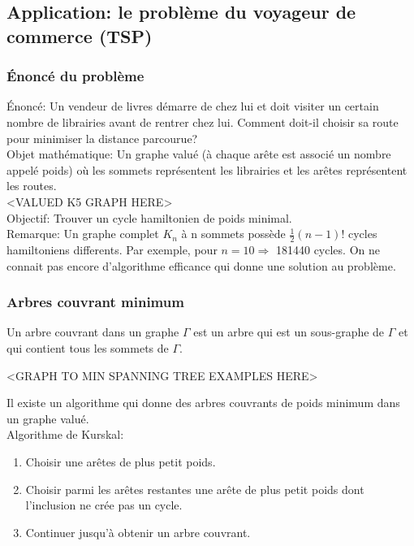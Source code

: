 \subsection{Application: le problème du voyageur de commerce (TSP)}

\subsubsection{Énoncé du problème}

Énoncé: Un vendeur de livres démarre de chez lui et doit visiter un certain nombre de librairies avant de rentrer chez lui. Comment doit-il choisir sa route pour minimiser la distance parcourue? \\ 

Objet mathématique: Un graphe valué (à chaque arête est associé un nombre appelé poids) où les sommets représentent les librairies et les arêtes représentent les routes.\\

<VALUED K5 GRAPH HERE>\\

Objectif: Trouver un cycle hamiltonien de poids minimal.\\

Remarque: Un graphe complet $K_{n}$ à n sommets possède $\frac{1}{2}(n-1)!$ cycles hamiltoniens differents. Par exemple, pour $n=10 \Rightarrow$ 181440 cycles. On ne connait pas encore d'algorithme efficance qui donne une solution au problème.\\

\subsubsection{Arbres couvrant minimum}

\begin{defn}
Un arbre couvrant dans un graphe $\Gamma$ est un arbre qui est un sous-graphe de $\Gamma$ et qui contient tous les sommets de $\Gamma$.\\
\end{defn}

\begin{exmp}
<GRAPH TO MIN SPANNING TREE EXAMPLES HERE>\\
\end{exmp}

Il existe un algorithme qui donne des arbres couvrants de poids minimum dans un graphe valué.\\

Algorithme de Kurskal:
\begin{enumerate}[i]
	\item Choisir une arêtes de plus petit poids.
	\item Choisir parmi les arêtes restantes une arête de plus petit poids dont l'inclusion ne crée pas un cycle.
	\item Continuer jusqu'à obtenir un arbre couvrant.\\
\end{enumerate}

